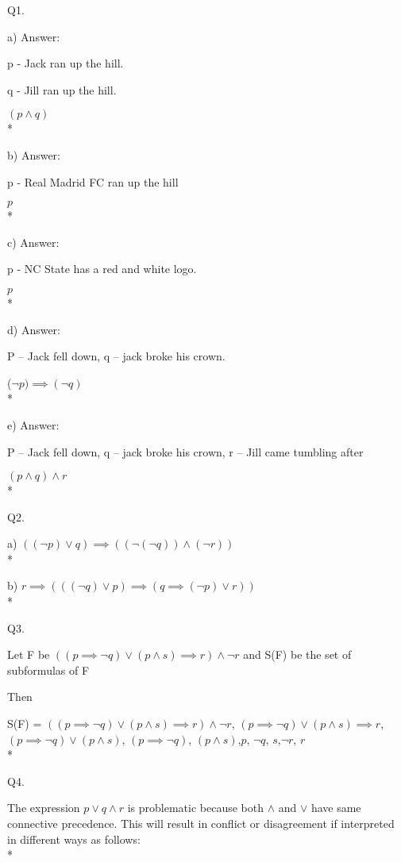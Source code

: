 \documentclass[12pt]{article}
\begin{document}
Q1.

 a) Answer:

 p - Jack ran up the hill.
 
 q - Jill ran up the hill.
 
 $(p \land q)$
 \\*
 
 b) Answer:

 p - Real Madrid FC ran up the hill
 
  $p$
 \\*
 
 c) Answer:

 p - NC State has a red and white logo.
 
  $p$
  \\*


 d) Answer:

 P – Jack fell down, q – jack broke his crown.
 
 ($\neg p) \implies (\neg q)\ $
 \\*
 

 e) Answer:

 P – Jack fell down, q – jack broke his crown, r – Jill came tumbling after

 $ (p \land q)\land r$
 \\*


 
 Q2.
 
 a) $((\neg p)\lor q) \implies ((\neg(\neg q))\land(\neg r))$
 \\*
 
 b) $r \implies(((\neg q)\lor p)\implies (q \implies (\neg p)\lor r))$
 \\*
 
 
 Q3.
 
Let F be $((p \implies \neg q) \lor (p \land s) \implies r) \land \neg r$ and S(F) be the set of subformulas of F

Then

S(F) = {$((p \implies \neg q) \lor (p \land s) \implies r) \land \neg r$, $(p \implies \neg q) \lor (p \land s) \implies r$, $(p \implies \neg q) \lor (p \land s)$, $(p \implies \neg q)$, $(p \land s)$,$p$, $\neg q$, $s$,$\neg r$, $r$}
\\*
 

Q4.

The expression $p \lor q \land r$ is problematic because both $\land$ and $\lor$ have same connective precedence. This will result in conflict or disagreement if interpreted in different ways as follows:
\\*
\end{document}
